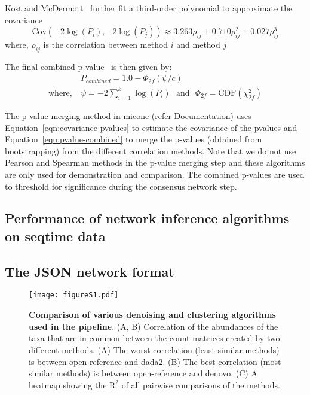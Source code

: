   Kost and McDermott~\cite{kost_combining_2002} further fit a third-order polynomial to approximate the covariance
  \begin{equation}
    \mathrm{Cov}\left( -2\log(P_i), -2\log(P_j) \right) \approx 3.263 \rho_{ij} + 0.710 \rho_{ij}^2 + 0.027 \rho_{ij}^3
    \label{eqn:covariance-pvalues}
  \end{equation}
  where, $\rho_{ij}$ is the correlation between method $i$ and method $j$

  The final combined p-value~\cite{Poole_Gibbs_Shmulevich_Bernard_Knijnenburg_2016} is then given by:
  \begin{equation}
    \begin{aligned}
        & P_{combined} = 1.0 - \Phi_{2f}\left( \psi / c \right) \\
        \text{where},~ &\psi = -2 \sum_{i=1}^k \log(P_i) ~~~\text{and}~~~ \Phi_{2f} = \mathrm{CDF}\left( \chi^2_{2f} \right)
    \end{aligned}
    \label{eqn:pvalue-combined}
  \end{equation}

  The p-value merging method in \ac{micone} (refer Documentation) uses Equation~\ref{eqn:covariance-pvalues} to estimate the covariance of the pvalues and Equation~\ref{eqn:pvalue-combined} to merge the p-values (obtained from bootstrapping) from the different correlation methods.
  Note that we do not use Pearson and Spearman methods in the p-value merging step and these algorithms are only used for demonstration and comparison.
  The combined p-values are used to threshold for significance during the consensus network step.

  \subsection*{Performance of network inference algorithms on seqtime data}
  \subsection*{The JSON network format}

  \begin{figure}[h]
  \centering
  \texttt{[image: figureS1.pdf]}
  \caption{
    \textbf{Comparison of various denoising and clustering algorithms used in the pipeline}.
    (A, B) Correlation of the abundances of the taxa that are in common between the count matrices created by two different methods.
    (A) The worst correlation (least similar methods) is between open-reference and dada2.
    (B) The best correlation (most similar methods) is between open-reference and denovo.
    (C) A heatmap showing the $\mathrm{R}^2$ of all pairwise comparisons of the methods.
  }
  \label{fig:figureS1}
\end{figure}

